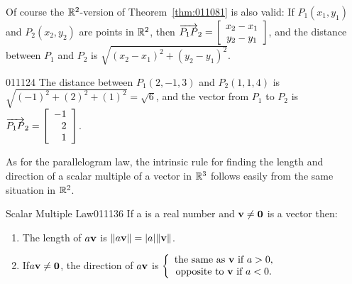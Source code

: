 Of course the $\mathbb{R}^2$-version of Theorem~\ref{thm:011081} is also valid: If $P_{1}(x_{1}, y_{1})$ and $P_{2}(x_{2}, y_{2})$ are points in $\mathbb{R}^2$, then $\overrightarrow{P_{1}P}_{2} = \left[
\begin{array}{c}
x_{2} - x_{1} \\
y_{2} - y_{1}   
\end{array}
\right]$, and the distance between $P_{1}$ and $P_{2}$ is $\sqrt{(x_{2} - x_{1})^2 + (y_{2} - y_{1})^2}$.

\begin{example}{}{011124}
The distance between $P_{1}(2, -1, 3)$ and $P_{2}(1, 1, 4)$ is $\sqrt{(-1)^2 + (2)^2 + (1)^2} = \sqrt{6}$, and the vector from  $P_{1}$ to $P_{2}$ is 
$\overrightarrow{P_{1}P}_{2} = \left[
\begin{array}{r}
-1 \\
2 \\
1  
\end{array}
\right]$.
\end{example}

As for the parallelogram law, the intrinsic rule for finding the length and direction of a scalar multiple of a vector in $\mathbb{R}^3$ follows easily from the same situation in $\mathbb{R}^2$.


\begin{theorem*}{Scalar Multiple Law}{011136}
If a is a real number and $\textbf{v} \neq \textbf{0}$ is a vector then:

\begin{enumerate}
\item The length of $a\textbf{v}$ is $\| a\textbf{v}\| = |a| \|\textbf{v}\|$.

\item If\footnotemark $a\textbf{v} \neq \textbf{0}$, the direction of $a\textbf{v}$ is 
$\left\lbrace
\begin{array}{c}
\mbox{the same as } \textbf{v} \mbox{ if } a > 0, \\
\mbox{opposite to } \textbf{v} \mbox{ if } a < 0.
\end{array}
\right.
$
 
\end{enumerate}
\end{theorem*}

